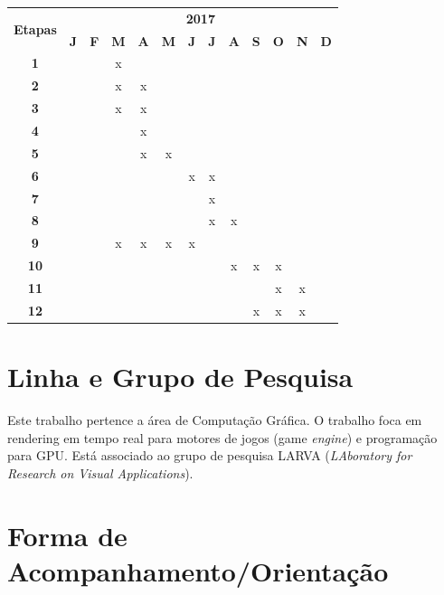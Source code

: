 \documentclass[11pt]{article}
\begin{document}
\vspace{0.5cm}
{\tiny
\noindent \begin{tabular}{|c||c|c|c|c|c|c|c|c|c|c|c|c|}
  \hline
  \multirow{2}{*}{\textbf{\small{Etapas}}} & \multicolumn{12}{|c||}{\textbf{\small{2017}}} \\
  \cline{2-13}
   & \textbf{J} & \textbf{F} & \textbf{M} & \textbf{A} & \textbf{M} & \textbf{J} & \textbf{J} & \textbf{A} & \textbf{S} & \textbf{O} & \textbf{N} & \textbf{D} \\
  \hline
  \hline
    \textbf{\small{1}} & & & x & & & & & & & & & \\
  \hline
    \textbf{\small{2}} & & & x & x & & & &  &  & & & \\
  \hline
    \textbf{\small{3}} & & & x & x & & & & & & & & \\
  \hline
    \textbf{\small{4}} & & & & x & & & & & & & & \\
  \hline
    \textbf{\small{5}} & & & & x & x & & & & & & & \\
  \hline
    \textbf{\small{6}} & & & & & & x & x & & & & & \\
  \hline
    \textbf{\small{7}} & & & & & & & x & & & & & \\
  \hline
    \textbf{\small{8}} & & & & & & & x & x & & & & \\
  \hline
    \textbf{\small{9}} & & & x & x & x & x & & & & & & \\
  \hline
    \textbf{\small{10}} & & & & & & & & x & x & x & & \\
  \hline
    \textbf{\small{11}} & & & & & & & & & & x & x & \\
  \hline
    \textbf{\small{12}} & & & & & & & & & x & x & x & \\
  \hline
\end{tabular}
}


\section{Linha e Grupo de Pesquisa}

Este trabalho pertence a área de Computação Gráfica. O trabalho foca
em rendering em tempo real para motores de jogos (game \textit{engine}) e
programação para GPU. Está associado ao grupo de pesquisa LARVA
(\textit{LAboratory for Research on Visual Applications}).

\section{Forma de Acompanhamento/Orientação}
\end{document}
